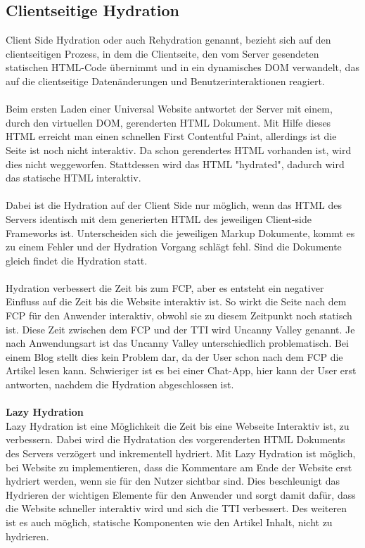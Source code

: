 \documentclass[runningheads]{llncs}
\begin{document}
\subsection{Clientseitige Hydration}
\label{subsec:Clientseitige Hydration}
Client Side Hydration oder auch Rehydration genannt, 
bezieht sich auf den clientseitigen Prozess, 
in dem die Clientseite, 
den vom Server gesendeten statischen HTML-Code übernimmt und 
in ein dynamisches DOM verwandelt, 
das auf die clientseitige Datenänderungen und Benutzerinteraktionen reagiert. 
\\
\\
Beim ersten Laden einer Universal Website antwortet der Server mit einem, 
durch den virtuellen DOM, gerenderten HTML Dokument. 
Mit Hilfe dieses HTML erreicht man einen schnellen First Contentful Paint, 
allerdings ist die Seite ist noch nicht interaktiv. 
Da schon gerendertes HTML vorhanden ist, 
wird dies nicht weggeworfen. Stattdessen wird das HTML "hydrated", 
dadurch wird das statische HTML interaktiv. 
\\
\\
Dabei ist die Hydration auf der Client Side nur möglich, 
wenn das HTML des Servers identisch mit dem generierten HTML des jeweiligen 
Client-side Frameworks ist. 
Unterscheiden sich die jeweiligen Markup Dokumente, 
kommt es zu einem Fehler und der Hydration Vorgang schlägt fehl. 
Sind die Dokumente gleich findet die Hydration statt.
\\
\\
Hydration verbessert die Zeit bis zum FCP, 
aber es entsteht ein negativer Einfluss auf die Zeit bis die Website interaktiv ist. 
So wirkt die Seite nach dem FCP für den Anwender interaktiv, 
obwohl sie zu diesem Zeitpunkt noch statisch ist. 
Diese Zeit zwischen dem FCP und der TTI wird Uncanny Valley genannt. 
Je nach Anwendungsart ist das Uncanny Valley unterschiedlich problematisch. 
Bei einem Blog stellt dies kein Problem dar, 
da der User schon nach dem FCP die Artikel lesen kann. 
Schwieriger ist es bei einer Chat-App, 
hier kann der User erst antworten, 
nachdem die Hydration abgeschlossen ist.
\\
\\
\textbf{Lazy Hydration}
\\
Lazy Hydration ist eine Möglichkeit die Zeit bis eine Webseite Interaktiv ist, 
zu verbessern. Dabei wird die Hydratation des vorgerenderten HTML Dokuments des Servers verzögert und 
inkrementell hydriert. Mit Lazy Hydration ist möglich, 
bei Website zu implementieren, 
dass die Kommentare am Ende der Website erst hydriert werden, 
wenn sie für den Nutzer sichtbar sind. 
Dies beschleunigt das Hydrieren der wichtigen Elemente für den Anwender und sorgt damit dafür, 
dass die Website schneller interaktiv wird und sich die TTI verbessert. 
Des weiteren ist es auch möglich, 
statische Komponenten wie den Artikel Inhalt, nicht zu hydrieren.
\end{document}
